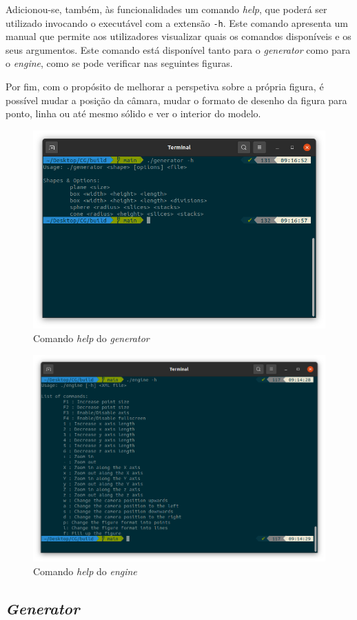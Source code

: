 \documentclass[a4paper, 11pt]{article}
\begin{document}
Adicionou-se, também, às funcionalidades um comando \textit{help}, que poderá ser utilizado 
invocando o executável com a extensão \texttt{-h}. Este comando apresenta um manual que permite aos
utilizadores visualizar quais os comandos disponíveis e os seus argumentos. Este comando está
disponível tanto para o \textit{generator} como para o \textit{engine}, como se pode verificar nas
seguintes figuras.

Por fim, com o propósito de melhorar a perspetiva sobre a própria figura, é possível mudar a 
posição da câmara, mudar o formato de desenho da figura para ponto, linha ou até mesmo sólido e ver
o interior do modelo.

\begin{figure}[H]
    \centering
    \includegraphics[width=.6\textwidth]{img/generator_h.png}
    \caption{Comando \textit{help} do \textit{generator}}
\end{figure}

\begin{figure}[H]
    \centering
    \includegraphics[width=.7\textwidth]{img/engine_h.png}
    \caption{Comando \textit{help} do \textit{engine}}
\end{figure}

\subsection{\textit{Generator}}
\end{document}
